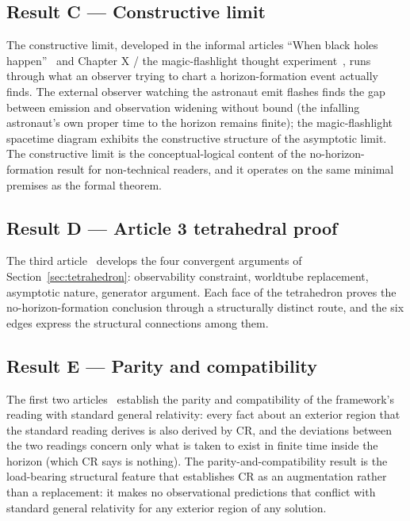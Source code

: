 \documentclass[11pt,a4paper]{article}
\theoremstyle{definition}
\begin{document}
\subsection{Result C --- Constructive limit}\label{sec:result-C}

The constructive limit, developed in the informal articles ``When black holes happen''~\cite{JanzenArticle1} and Chapter X / the magic-flashlight thought experiment~\cite{JanzenChapterX}, runs through what an observer trying to chart a horizon-formation event actually finds. The external observer watching the astronaut emit flashes finds the gap between emission and observation widening without bound (the infalling astronaut's own proper time to the horizon remains finite); the magic-flashlight spacetime diagram exhibits the constructive structure of the asymptotic limit. The constructive limit is the conceptual-logical content of the no-horizon-formation result for non-technical readers, and it operates on the same minimal premises as the formal theorem.

\subsection{Result D --- Article 3 tetrahedral proof}\label{sec:result-D}

The third article~\cite{JanzenArticle3} develops the four convergent arguments of Section~\ref{sec:tetrahedron}: observability constraint, worldtube replacement, asymptotic nature, generator argument. Each face of the tetrahedron proves the no-horizon-formation conclusion through a structurally distinct route, and the six edges express the structural connections among them.

\subsection{Result E --- Parity and compatibility}\label{sec:result-E}

The first two articles~\cite{JanzenArticle1, JanzenArticle2} establish the parity and compatibility of the framework's reading with standard general relativity: every fact about an exterior region that the standard reading derives is also derived by CR, and the deviations between the two readings concern only what is taken to exist in finite time inside the horizon (which CR says is nothing). The parity-and-compatibility result is the load-bearing structural feature that establishes CR as an augmentation rather than a replacement: it makes no observational predictions that conflict with standard general relativity for any exterior region of any solution.
\end{document}
